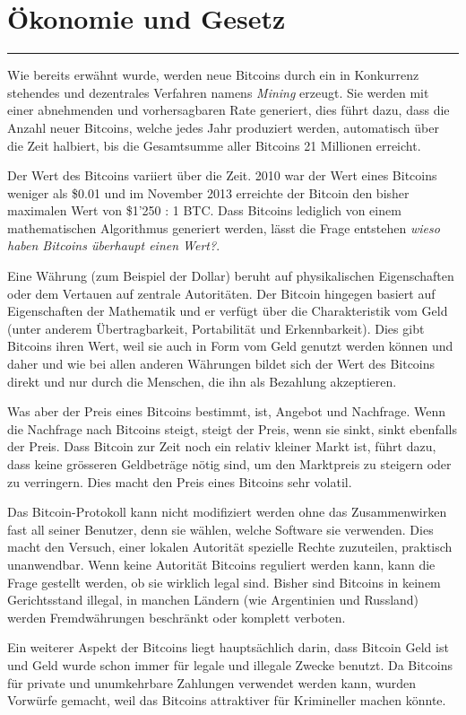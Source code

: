 \section*{Ökonomie und Gesetz}
\vspace{-10mm}
\noindent\rule{0.8\textwidth}{0.4pt}

\vspace{5mm}

\noindent
Wie bereits erwähnt wurde, werden neue Bitcoins durch ein in Konkurrenz stehendes und
dezentrales Verfahren namens \emph{Mining} erzeugt. Sie werden mit einer abnehmenden
und vorhersagbaren Rate generiert, dies führt dazu, dass die Anzahl neuer Bitcoins,
welche jedes Jahr produziert werden, automatisch über die Zeit halbiert, bis die Gesamtsumme
aller Bitcoins 21 Millionen erreicht.

\noindent
Der Wert des Bitcoins variiert über die Zeit. 2010 war der Wert eines Bitcoins weniger
als \$0.01 und im November 2013 erreichte der Bitcoin den bisher maximalen Wert
von \$1'250 : 1 BTC. Dass Bitcoins lediglich von einem mathematischen Algorithmus
generiert werden, lässt die Frage entstehen \emph{\dq wieso haben Bitcoins
überhaupt einen Wert?\dq}.

\noindent
Eine Währung (zum Beispiel der Dollar) beruht auf physikalischen Eigenschaften oder dem Vertauen
auf zentrale Autoritäten. Der Bitcoin hingegen basiert auf Eigenschaften der Mathematik und
er verfügt über die Charakteristik vom Geld (unter anderem Übertragbarkeit, Portabilität und
Erkennbarkeit). Dies gibt Bitcoins ihren Wert, weil sie auch in Form vom Geld genutzt werden
können und daher und wie bei allen anderen Währungen bildet sich der Wert des Bitcoins direkt und
nur durch die Menschen, die ihn als Bezahlung akzeptieren.

\noindent
Was aber der Preis eines Bitcoins bestimmt, ist, Angebot und Nachfrage. Wenn die Nachfrage nach
Bitcoins steigt, steigt der Preis, wenn sie sinkt, sinkt ebenfalls der Preis. Dass Bitcoin zur Zeit
noch ein relativ kleiner Markt ist, führt dazu, dass keine grösseren Geldbeträge nötig sind, um den
Marktpreis zu steigern oder zu verringern. Dies macht den Preis eines Bitcoins sehr volatil.

\noindent
Das Bitcoin-Protokoll kann nicht modifiziert werden ohne das Zusammenwirken fast all seiner Benutzer,
denn sie wählen, welche Software sie verwenden. Dies macht den Versuch, einer lokalen Autorität
spezielle Rechte zuzuteilen, praktisch unanwendbar. Wenn keine Autorität Bitcoins reguliert werden kann,
kann die Frage gestellt werden, ob sie wirklich legal sind. Bisher sind Bitcoins in keinem Gerichtsstand
illegal, in manchen Ländern (wie Argentinien und Russland) werden Fremdwährungen beschränkt oder
komplett verboten.

\noindent
Ein weiterer Aspekt der Bitcoins liegt hauptsächlich darin, dass Bitcoin Geld ist und Geld wurde
schon immer für legale und illegale Zwecke benutzt. Da Bitcoins für private und unumkehrbare Zahlungen
verwendet werden kann, wurden Vorwürfe gemacht, weil das Bitcoins attraktiver für Krimineller machen
könnte.
